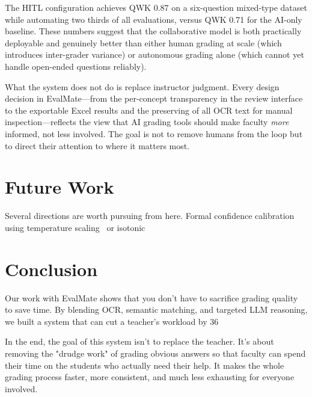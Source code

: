 \documentclass[conference]{IEEEtran}
\begin{document}
The HITL configuration achieves QWK 0.87 on a six-question
mixed-type dataset while automating two thirds of all evaluations,
versus QWK 0.71 for the AI-only baseline. These numbers suggest
that the collaborative model is both practically deployable and
genuinely better than either human grading at scale (which
introduces inter-grader variance) or autonomous grading alone
(which cannot yet handle open-ended questions reliably).

What the system does not do is replace instructor judgment. Every
design decision in EvalMate---from the per-concept transparency
in the review interface to the exportable Excel results and the
preserving of all OCR text for manual inspection---reflects the
view that AI grading tools should make faculty \textit{more}
informed, not less involved. The goal is not to remove humans from
the loop but to direct their attention to where it matters most.

\section{Future Work}

Several directions are worth pursuing from here. Formal confidence
calibration using temperature scaling~\cite{guo2017} or isotonic
\section{Conclusion}

Our work with EvalMate shows that you don't have to sacrifice grading quality to save time. By blending OCR, semantic matching, and targeted LLM reasoning, we built a system that can cut a teacher's workload by 36%

In the end, the goal of this system isn't to replace the teacher. It's about removing the "drudge work" of grading obvious answers so that faculty can spend their time on the students who actually need their help. It makes the whole grading process faster, more consistent, and much less exhausting for everyone involved.
\end{document}
